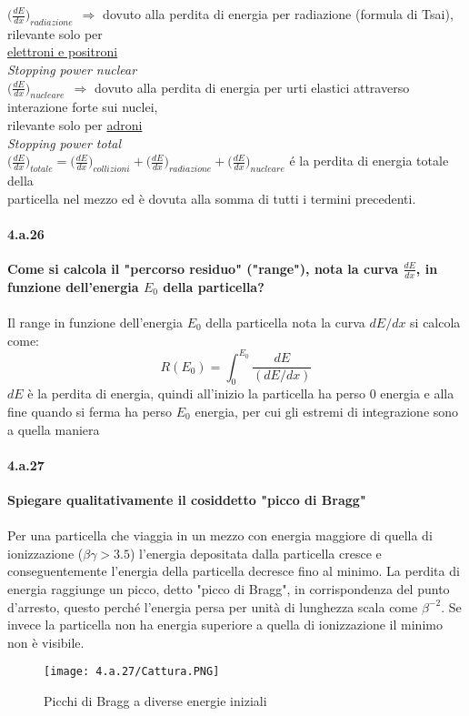 \documentclass[twoside]{article}
\begin{document}
{\large$\biggl(\frac{dE}{dx}\biggr)_{radiazione}\ \ \Rightarrow$}  dovuto alla perdita di energia per radiazione (formula di Tsai), rilevante solo per\\

\underline{elettroni e positroni}\\

\textit{Stopping power nuclear}\\

{\large$\biggl(\frac{dE}{dx}\biggr)_{nucleare}\ \ \Rightarrow$}  dovuto alla perdita di energia per urti elastici attraverso interazione forte sui nuclei,\\

rilevante solo per \underline{adroni}\\

\textit{Stopping power total}\\

{\large$\biggl(\frac{dE}{dx}\biggr)_{totale}=\biggl(\frac{dE}{dx}\biggr)_{collizioni}+\biggl(\frac{dE}{dx}\biggr)_{radiazione}+\biggl(\frac{dE}{dx}\biggr)_{nucleare}$}  é la perdita di energia totale della\\

particella nel mezzo ed è dovuta alla somma di tutti i termini precedenti.


\paragraph{4.a.26}\textbf{Come si calcola il "percorso residuo" ("range"), nota la curva $\frac{dE}{dx}$, in funzione dell'energia $E_0$ della particella?}\\ \\
Il range in funzione dell'energia $E_0$ della particella nota la curva $dE/dx$ si calcola come:
\begin{equation}
    R(E_0)=\int_0^{E_0}\frac{dE}{(dE/dx)}
\end{equation}
$dE$ è la perdita di energia, quindi all'inizio la particella ha perso $0$ energia e alla fine quando si ferma ha perso $E_0$ energia, per cui gli estremi di integrazione sono a quella maniera
\paragraph{4.a.27}\textbf{Spiegare qualitativamente il cosiddetto "picco di Bragg"}\\ \\
Per una particella che viaggia in un mezzo con energia maggiore di quella di ionizzazione ($\beta\gamma>3.5$) l'energia depositata dalla particella cresce e conseguentemente l'energia della particella decresce fino al minimo. La perdita di energia raggiunge un picco, detto "picco di Bragg", in corrispondenza del punto d'arresto, questo perché l'energia persa per unità di lunghezza scala come $\beta^{-2}$. Se invece la particella non ha energia superiore a quella di ionizzazione il minimo non è visibile. 
\begin{figure}[H]
    \centering
    \texttt{[image: 4.a.27/Cattura.PNG]}
    \caption{Picchi di Bragg a diverse energie iniziali}
    \label{fig:my_label}
\end{figure}
\end{document}
